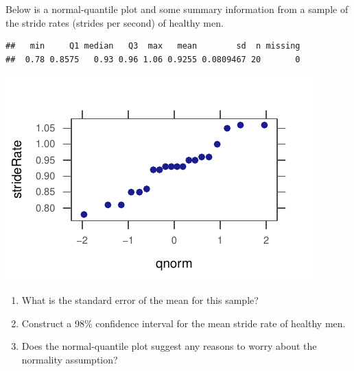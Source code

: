 \documentclass[twoside]{book}\usepackage[]{graphicx}\usepackage[]{xcolor}
\makeatletter
\def\maxwidth{ %
  \ifdim\Gin@nat@width>\linewidth
    \linewidth
  \else
    \Gin@nat@width
  \fi
}
\newenvironment{kframe}{%
 \def\at@end@of@kframe{}%
 \ifinner\ifhmode%
  \def\at@end@of@kframe{\end{minipage}}%
  \begin{minipage}{\columnwidth}%
 \fi\fi%
 \def\FrameCommand##1{\hskip\@totalleftmargin \hskip-\fboxsep
 \colorbox{shadecolor}{##1}\hskip-\fboxsep
     \hskip-\linewidth \hskip-\@totalleftmargin \hskip\columnwidth}%
 \MakeFramed {\advance\hsize-\width
   \@totalleftmargin\z@ \linewidth\hsize
   \@setminipage}}%
 {\par\unskip\endMakeFramed%
 \at@end@of@kframe}
\newenvironment{knitrout}{}{} %
\makeatother
\begin{document}
\begin{problem}
	Below is a normal-quantile plot and some summary information from a 
	sample of the stride rates (strides per second) 
	of healthy men.

\begin{knitrout}
\color{fgcolor}\begin{kframe}
\begin{verbatim}
##   min     Q1 median   Q3  max   mean        sd  n missing
##  0.78 0.8575   0.93 0.96 1.06 0.9255 0.0809467 20       0
\end{verbatim}
\end{kframe}

{\centering \includegraphics[width=\maxwidth]{figures/fig-unnamed-chunk-141-1} 

}



\end{knitrout}
	\begin{enumerate}
		\item
			What is the standard error of the mean for this sample?
		\item 
			Construct a 98\% confidence interval 
			for the mean stride rate of healthy men.  
		\item
			Does the normal-quantile plot suggest any reasons to worry about the 
			normality assumption?
	\end{enumerate}
\end{problem}
\end{document}
